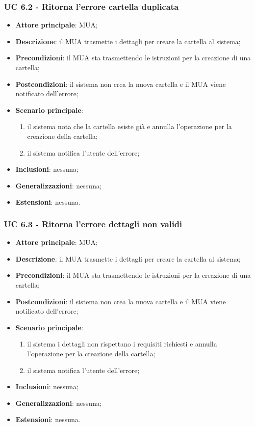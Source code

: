 \subsubsection{UC 6.2 - Ritorna l'errore cartella duplicata} \label{sec:UC6.2}
    \begin{itemize}
        \item \textbf{Attore principale}: MUA;
        \item \textbf{Descrizione}: il MUA trasmette i dettagli per creare la cartella al sistema;
        \item \textbf{Precondizioni}: il MUA sta trasmettendo le istruzioni per la creazione di una cartella;
        \item \textbf{Postcondizioni}: il sistema non crea la nuova cartella e il MUA viene notificato dell'errore;
        \item \textbf{Scenario principale}:
            \begin{enumerate}
                \item il sistema nota che la cartella esiste già e annulla l'operazione per la creazione della cartella;
                \item il sistema notifica l'utente dell'errore;
            \end{enumerate}
        \item \textbf{Inclusioni}: nessuna;
        \item \textbf{Generalizzazioni}: nessuna;
        \item \textbf{Estensioni}: nessuna.
    \end{itemize}

    \subsubsection{UC 6.3 - Ritorna l'errore dettagli non validi} \label{sec:UC6.3}
    \begin{itemize}
        \item \textbf{Attore principale}: MUA;
        \item \textbf{Descrizione}: il MUA trasmette i dettagli per creare la cartella al sistema;
        \item \textbf{Precondizioni}: il MUA sta trasmettendo le istruzioni per la creazione di una cartella;
        \item \textbf{Postcondizioni}: il sistema non crea la nuova cartella e il MUA viene notificato dell'errore;
        \item \textbf{Scenario principale}:
            \begin{enumerate}
                \item il sistema i dettagli non rispettano i requisiti richiesti e annulla l'operazione per la creazione della cartella;
                \item il sistema notifica l'utente dell'errore;
            \end{enumerate}
        \item \textbf{Inclusioni}: nessuna;
        \item \textbf{Generalizzazioni}: nessuna;
        \item \textbf{Estensioni}: nessuna.
    \end{itemize}